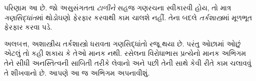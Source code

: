 \documentclass[../../../include/open-logic-section]{subfiles}
\begin{document}
પરિણામ આ છે. જો અસુસંગતતા \emph{ટાળીને} સહજ ગણરચના સ્વીકારવી
હોય, તો માત્ર \emph{ગણસિદ્ધાંત}માં થોડોઘણો ફેરફાર કરવાથી કામ
ચાલશે નહીં. તેના બદલે \emph{તર્કશાસ્ત્ર}માં મૂળભૂત ફેરફાર કરવા પડે.

અલબત્ત, અશાસ્ત્રીય તર્કશાસ્ત્રો ધરાવતા ગણસિદ્ધાંતો રજૂ થયા છે.
પરંતુ ઓછામાં ઓછું એટલું તો કહી શકાય કે તેઓ માનક નથી. રસેલના
વિરોધાભાસ પ્રત્યેનો માનક અભિગમ તેને સીધી અનસ્તિત્વની સાબિતી તરીકે
લેવાનો અને પછી તેની સાથે કેવી રીતે કામ ચલાવવું તે શીખવાનો છે.
આપણે આ જ અભિગમ અપનાવીશું.
\end{document}

